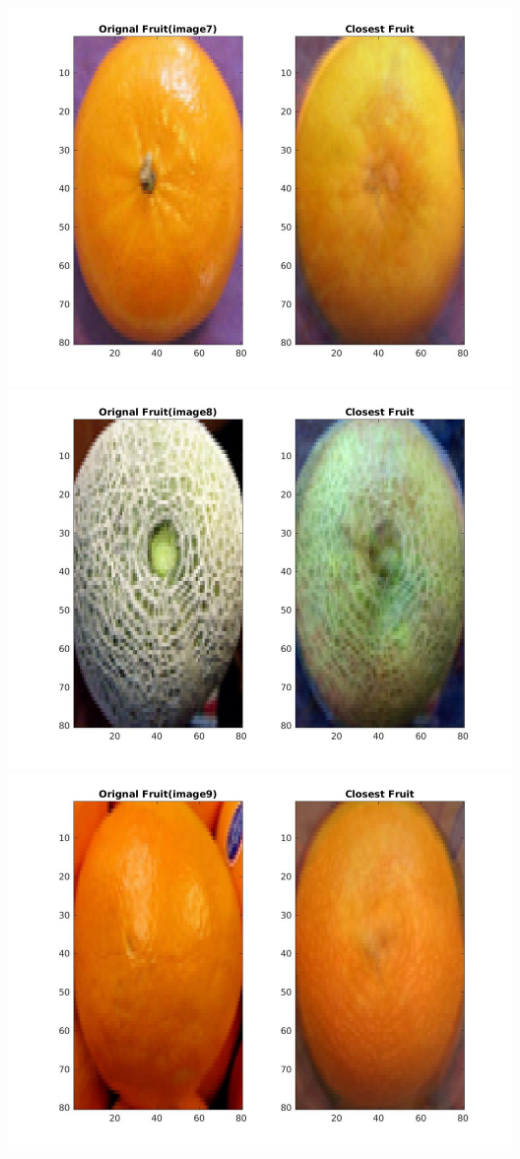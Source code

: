 \documentclass[12pt, a4paper]{article}
\begin{document}
\includegraphics[width=\textwidth, height = 0.25\paperheight]{Closest_fruit_analysis_7}
\includegraphics[width=\textwidth, height = 0.25\paperheight]{Closest_fruit_analysis_8}
\includegraphics[width=\textwidth, height = 0.25\paperheight]{Closest_fruit_analysis_9}
\end{document}
